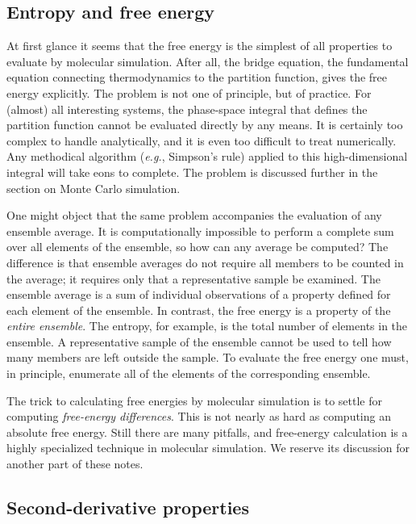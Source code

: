 \documentclass[9pt,bestpractices]{molsim}
\begin{document}
\subsection{Entropy and free energy}\label{entropy-and-free-energy}

At first glance it seems that the free energy is the simplest of all
properties to evaluate by molecular simulation. After all, the bridge
equation, the fundamental equation connecting thermodynamics to the
partition function, gives the free energy explicitly. The problem is not
one of principle, but of practice. For (almost) all interesting systems,
the phase-space integral that defines the partition function cannot be
evaluated directly by any means. It is certainly too complex to handle
analytically, and it is even too difficult to treat numerically. 
Any
methodical algorithm (\emph{e.g.}, Simpson's rule) applied to this
high-dimensional integral will take eons to complete. The problem is
discussed further in the section on Monte Carlo simulation.

One might object that the same problem accompanies the evaluation of any
ensemble average. It is computationally impossible to perform a complete
sum over all elements of the ensemble, so how can any average be
computed? The difference is that ensemble averages do not require all
members to be counted in the average; it requires only that a
representative sample be examined. The ensemble average is a sum of
individual observations of a property defined for each element of the
ensemble. In contrast, the free energy is a property of the \emph{entire
ensemble}. The entropy, for example, is the total number of elements in
the ensemble. A representative sample of the ensemble cannot be used to
tell how many members are left outside the sample. To evaluate the free
energy one must, in principle, enumerate all of the elements of the
corresponding ensemble.

The trick to calculating free energies by molecular simulation is to
settle for computing \emph{free-energy differences}. This is not nearly
as hard as computing an absolute free energy. Still there are many
pitfalls, and free-energy calculation is a highly specialized technique
in molecular simulation. We reserve its discussion for another part of
these notes.

\subsection{Second-derivative
properties}\label{second-derivative-properties}
\end{document}
